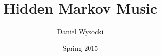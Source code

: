 \documentclass[12pt]{article}
\author{Daniel Wysocki}
\title{Hidden Markov Music}
\date{Spring 2015}
\begin{document}
\maketitle

\nocite{*}

\printbibliography
\end{document}
